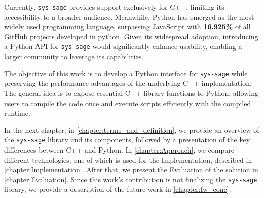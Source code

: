Currently, \texttt{sys-sage} provides support exclusively for C++, limiting its accessibility to a broader audience. Meanwhile, Python has emerged as the most widely used programming language, surpassing JavaScript with \textbf{16.925\%} of all GitHub projects developed in python. Given its widespread adoption, introducing a Python \ac{API} for \texttt{sys-sage} would significantly enhance usability, enabling a larger community to leverage its capabilities. \cite{languages-github-stats}

The objective of this work is to develop a Python interface for \texttt{sys-sage} while preserving the performance advantages of the underlying C++ implementation. The general idea is to expose essential C++ library functions to Python, allowing users to compile the code once and execute scripts efficiently with the compiled runtime.

In the next chapter, in \autoref{chapter:terms_and_definition}, we provide an overview of the \texttt{sys-sage} library and its components, followed by a presentation of the key differences between C++ and Python.
In \autoref{chapter:Approach}, we compare different technologies, one of which is used for the Implementation, described in \autoref{chapter:Implementation}. After that, we present the Evaluation of the solution in \autoref{chapter:Evaluation}.
Since this work's contribution is not finalizing the \texttt{sys-sage} library, we provide a description of the future work in \autoref{chapter:fw_conc}.
